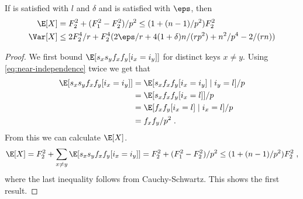 \begin{lemma}
    If  is satisfied with $l$
    and $\delta$ and  is satisfied with
    $\eps$, then
    \begin{align}
        \E[X] &= F_2^2 + (F_1^2 - F_2^2)/p^2 \le (1 + (n - 1)/p^2)F_2^2\\
        \Var[X] &\le 2F_2^4/r + F_2^4 (2\eps/r + 4(1 + \delta)n / (rp^2) + n^2/p^4 - 2 /(rn))
    \end{align}
\end{lemma}
\begin{proof}
    We first bound $\E[s_x s_y f_x f_y [i_x = i_y]]$ for distinct keys
    $x \neq y$. Using \cref{eq:near-independence} twice we get that
    \begin{equation}\begin{split}\label{eq:twice-split}
        \E[s_x s_y f_x f_y [i_x = i_y]]
            &= \E[s_x f_x f_y [i_x = i_y] \mid i_y = l]/p
            \\&= \E[s_x f_x f_y [i_x = l]]/p
            \\&= \E[f_x f_y [i_x = l] \mid i_x = l]/p
            \\&= f_x f_y / p^2 \; .
    \end{split}\end{equation}
    From this we can calculate $\E[X]$.
    \begin{align*}
        \E[X]
            = F_2^2 + \sum_{x \neq y} \E[s_x s_y f_x f_y [i_x = i_y]]
            = F_2^2 + (F_1^2 - F_2^2)/p^2
            \le (1 + (n - 1)/p^2)F_2^2 \; ,
    \end{align*}
    where the last inequality follows from Cauchy-Schwartz. This shows the first result.


\end{proof}
